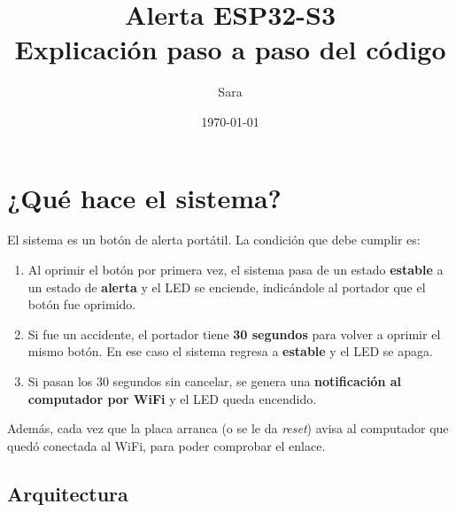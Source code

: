\documentclass[11pt,a4paper]{article}
\title{\textbf{Alerta ESP32-S3}\\[4pt]\large Explicación paso a paso del código}
\author{Sara}
\date{\today}
\begin{document}
\maketitle
\tableofcontents
\newpage

\section{¿Qué hace el sistema?}

El sistema es un botón de alerta portátil. La condición que debe cumplir es:

\begin{enumerate}[leftmargin=*]
  \item Al oprimir el botón por primera vez, el sistema pasa de un estado
        \textbf{estable} a un estado de \textbf{alerta} y el LED se enciende,
        indicándole al portador que el botón fue oprimido.
  \item Si fue un accidente, el portador tiene \textbf{30 segundos} para volver a
        oprimir el mismo botón. En ese caso el sistema regresa a \textbf{estable}
        y el LED se apaga.
  \item Si pasan los 30 segundos sin cancelar, se genera una
        \textbf{notificación al computador por WiFi} y el LED queda encendido.
\end{enumerate}

Además, cada vez que la placa arranca (o se le da \textit{reset}) avisa al
computador que quedó conectada al WiFi, para poder comprobar el enlace.

\subsection{Arquitectura}

\begin{center}
\end{center}
\end{document}
